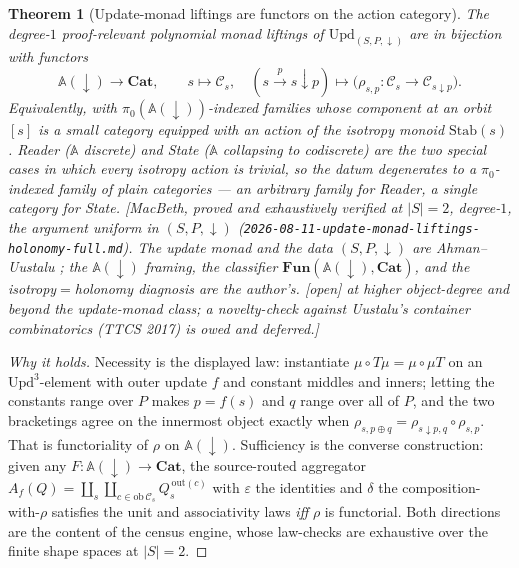 \documentclass[11pt,a4paper]{book}
\newcommand{\Cat}{\mathbf{Cat}}
\newcommand{\ob}{\mathrm{ob}\,}
\theoremstyle{plain}
\newtheorem{Theorem}{Theorem}[chapter]
\theoremstyle{definition}
\theoremstyle{remark}
\newcommand{\prov}[1]{\hfill\textsf{\footnotesize[#1]}}
\begin{document}
\begin{Theorem}[Update-monad liftings are functors on the action category]\label{thm:update-classification}
The degree-$1$ proof-relevant polynomial monad liftings of $\mathrm{Upd}_{(S,P,\downarrow)}$ are in
bijection with functors
\[
   \mathbb A(\downarrow)\longrightarrow\Cat,\qquad s\mapsto\mathcal C_{s},\quad
   (s\xrightarrow{p}s{\downarrow}p)\mapsto\bigl(\rho_{s,p}\colon\mathcal C_{s}\to\mathcal C_{s{\downarrow}p}\bigr).
\]
Equivalently, with $\pi_{0}(\mathbb A(\downarrow))$-indexed families whose component at an orbit $[s]$ is
a small category equipped with an action of the isotropy monoid $\mathrm{Stab}(s)$. Reader
($\mathbb A$ discrete) and State ($\mathbb A$ collapsing to codiscrete) are the two special cases in
which every isotropy action is trivial, so the datum degenerates to a $\pi_{0}$-indexed family of
\emph{plain} categories --- an arbitrary family for Reader, a single category for State.
\prov{MacBeth, proved and exhaustively verified at $|S|=2$, degree-$1$, the argument uniform in
$(S,P,\downarrow)$ (\texttt{2026-08-11-update-monad-liftings-holonomy-full.md}). The update monad and
the data $(S,P,\downarrow)$ are Ahman--Uustalu \cite{AhmanUustalu13}; the $\mathbb A(\downarrow)$
framing, the classifier $\mathbf{Fun}(\mathbb A(\downarrow),\Cat)$, and the
isotropy${}={}$holonomy diagnosis are the author's. \textsf{[open]} at higher object-degree and beyond
the update-monad class; a novelty-check against Uustalu's \emph{container combinatorics} (TTCS 2017) is
owed and deferred.}
\end{Theorem}

\begin{proof}[Why it holds]
Necessity is the displayed law: instantiate $\mu\circ T\mu=\mu\circ\mu T$ on an
$\mathrm{Upd}^{3}$-element with outer update $f$ and constant middles and inners; letting the constants
range over $P$ makes $p=f(s)$ and $q$ range over all of $P$, and the two bracketings agree on the
innermost object exactly when $\rho_{s,p\oplus q}=\rho_{s{\downarrow}p,q}\circ\rho_{s,p}$. That is
functoriality of $\rho$ on $\mathbb A(\downarrow)$. Sufficiency is the converse construction: given any
$F\colon\mathbb A(\downarrow)\to\Cat$, the source-routed aggregator
$A_{f}(Q)=\coprod_{s}\coprod_{c\in\ob\mathcal C_{s}}Q_{s}^{\,\mathrm{out}(c)}$ with $\varepsilon$ the
identities and $\delta$ the composition-with-$\rho$ satisfies the unit and associativity laws \emph{iff}
$\rho$ is functorial. Both directions are the content of the census engine, whose law-checks are
exhaustive over the finite shape spaces at $|S|=2$.
\end{proof}
\end{document}
